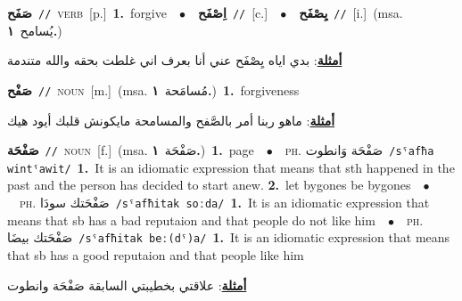 \documentclass[10pt,a4paper,twoside]{article} %
\begin{document}
\begin{multicols}{2}
{\setlength\topsep{0pt}\textbf{\foreignlanguage{arabic}{صَفَح}}\ {\color{gray}\texttt{//}\color{black}}\ \textsc{verb}\ [p.]\ \textbf{1.}~forgive\ \ $\bullet$\ \ \setlength\topsep{0pt}\textbf{\foreignlanguage{arabic}{اِصْفَح}}\ {\color{gray}\texttt{//}\color{black}}\ [c.]\ \ $\bullet$\ \ \setlength\topsep{0pt}\textbf{\foreignlanguage{arabic}{يِصْفَح}}\ {\color{gray}\texttt{//}\color{black}}\ [i.]\ \color{gray}(msa. \foreignlanguage{arabic}{يُسامح}~\foreignlanguage{arabic}{\textbf{١.}})\color{black}\  \begin{flushright}\color{gray}\foreignlanguage{arabic}{\textbf{\underline{\foreignlanguage{arabic}{أمثلة}}}: بدي اياه يِصْفَح عني أنا بعرف اني غلطت بحقه والله متندمة}\end{flushright}\color{black}} \vspace{2mm}

{\setlength\topsep{0pt}\textbf{\foreignlanguage{arabic}{صَفْح}}\ {\color{gray}\texttt{//}\color{black}}\ \textsc{noun}\ [m.]\ \color{gray}(msa. \foreignlanguage{arabic}{مُسامَحة}~\foreignlanguage{arabic}{\textbf{١.}})\color{black}\ \textbf{1.}~forgiveness\  \begin{flushright}\color{gray}\foreignlanguage{arabic}{\textbf{\underline{\foreignlanguage{arabic}{أمثلة}}}: ماهو ربنا أمر بالصَّفح والمسامحة مايكونش قلبك أيود هيك}\end{flushright}\color{black}} \vspace{2mm}

{\setlength\topsep{0pt}\textbf{\foreignlanguage{arabic}{صَفْحَة}}\ {\color{gray}\texttt{//}\color{black}}\ \textsc{noun}\ [f.]\ \color{gray}(msa. \foreignlanguage{arabic}{صَفْحَة}~\foreignlanguage{arabic}{\textbf{١.}})\color{black}\ \textbf{1.}~page\ \ $\bullet$\ \ \textsc{ph.} \color{gray} \foreignlanguage{arabic}{صَفْحَة وَانطوت}\color{black}\ {\color{gray}\texttt{/{\sffamily sˤafħa wintˤawit}/}\color{black}}\ \textbf{1.}~It is an idiomatic expression that means that sth happened in the past and the person has decided to start anew.  \textbf{2.}~let bygones be bygones\ \ $\bullet$\ \ \textsc{ph.} \color{gray} \foreignlanguage{arabic}{صَفْحَتك سودَا}\color{black}\ {\color{gray}\texttt{/{\sffamily sˤafħitak soːda}/}\color{black}}\ \textbf{1.}~It is an idiomatic expression that means that sb has a bad reputaion and that people do not like him\ \ $\bullet$\ \ \textsc{ph.} \color{gray} \foreignlanguage{arabic}{صَفْحَتك بيضَا}\color{black}\ {\color{gray}\texttt{/{\sffamily sˤafħitak beː(dˤ)a}/}\color{black}}\ \textbf{1.}~It is an idiomatic expression that means that sb has a good reputaion and that people like him\  \begin{flushright}\color{gray}\foreignlanguage{arabic}{\textbf{\underline{\foreignlanguage{arabic}{أمثلة}}}: علاقتي بخطيبتي السابقة صَفْحَة وانطوت}\end{flushright}\color{black}} \vspace{2mm}


\end{multicols}
\end{document}
